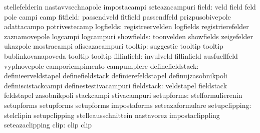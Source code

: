                                   stellefelderin                   nastavvsechnapole
                                  impostacampi                     seteazacampuri
                           field: veld                             field
                                  feld                             pole
                                  campi                            camp
                        fitfield: passendveld                      fitfield
                                  passendfeld                      prizpusobivepole %
                                  adattacampo                      potrivestecamp
                       logfields: registreervelden                 logfields
                                  registrierefelder                zaznamovepole
                                  logcampi                         logcampuri %
                      showfields: toonvelden                       showfields
                                  zeigefelder                      ukazpole
                                  mostracampi                      afiseazacampuri
                         tooltip: suggestie                        tooltip
                                  tooltip                          bublinkovanapoveda
                                  tooltip                          tooltip %
                     fillinfield: invulveld                        fillinfield
                                  ausfuellfeld                     vyplnovepole
                                  camporiempimento                 campumplere
                definefieldstack: definieerveldstapel              definefieldstack
                                  definierefeldstapel              definujzasobnikpoli
                                  definiscistackcampi              definestestivacampuri %
                      fieldstack: veldstapel                       fieldstack
                                  feldstapel                       zasobnikpoli
                                  stackcampi                       stivacampuri
                      setupforms: stelformulierenin                setupforms
                                  setupforms                       setupforms
                                  impostaforms                     seteazaformulare %
                   setupclipping: stelclipin                       setupclipping
                                  stelleausschnittein              nastavorez
                                  impostaclippling                 seteazaclipping %
                            clip: clip                             clip
